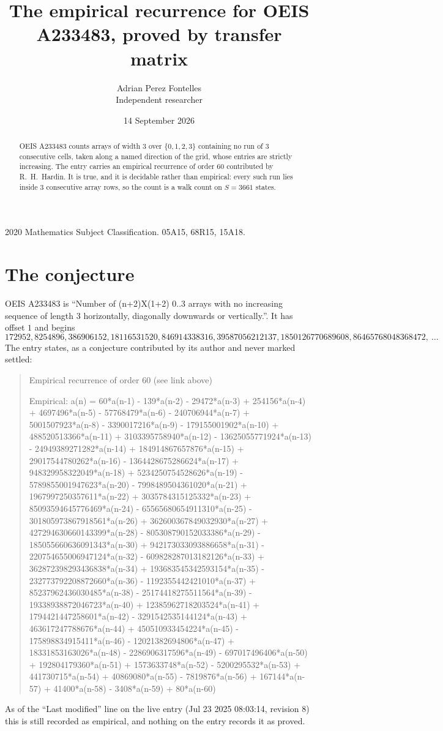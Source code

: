 \documentclass[11pt,a4paper]{article}
\title{The empirical recurrence for OEIS A233483, proved by transfer matrix}
\author{Adrian Perez Fontelles\\ \small Independent researcher}
\date{14 September 2026}
\theoremstyle{plain}
\theoremstyle{definition}
\begin{document}
\maketitle

\begin{abstract}
OEIS A233483 counts arrays of width $3$ over $\{0,1,2,3\}$ containing no run of $3$ consecutive
cells, taken along a named direction of the grid, whose entries are strictly increasing. The entry carries
an empirical recurrence of order $60$ contributed by R.~H.~Hardin. It is true, and it is
decidable rather than empirical: every such run lies inside $3$ consecutive array rows, so
the count is a walk count on $S=3661$ states.
\end{abstract}

\noindent\small 2020 Mathematics Subject Classification. 05A15, 68R15, 15A18.\normalsize

\section{The conjecture}

OEIS A233483 is ``Number of (n+2)X(1+2) 0..3 arrays with no increasing sequence of length 3 horizontally, diagonally downwards or vertically.''. It has offset $1$ and begins
\[
172952, 8254896, 386906152, 18116531520, 846914338316, 39587056212137, 1850126770689608, 86465768048368472,\ \dots
\]
The entry states, as a conjecture contributed by its author and never marked settled:
\begin{quote}
Empirical recurrence of order 60 (see link above)

Empirical: a(n) = 60*a(n-1) - 139*a(n-2) - 29472*a(n-3) + 254156*a(n-4) + 4697496*a(n-5) - 57768479*a(n-6) - 240706944*a(n-7) + 5001507923*a(n-8) - 3390017216*a(n-9) - 179155001902*a(n-10) + 488520513366*a(n-11) + 3103395758940*a(n-12) - 13625055771924*a(n-13) - 24949389271282*a(n-14) + 184914867657876*a(n-15) + 29017544780262*a(n-16) - 1364428675286624*a(n-17) + 948329958322049*a(n-18) + 5234250754528626*a(n-19) - 5789855001947623*a(n-20) - 7998489504361020*a(n-21) + 1967997250357611*a(n-22) + 3035784315125332*a(n-23) + 85093594645776469*a(n-24) - 65565680654911310*a(n-25) - 301805973867918561*a(n-26) + 362600367849032930*a(n-27) + 427294630660143399*a(n-28) - 805308790152033386*a(n-29) - 185055660636091343*a(n-30) + 942173033093886658*a(n-31) - 220754655006947124*a(n-32) - 609828287013182126*a(n-33) + 362872398293436838*a(n-34) + 193683545342593154*a(n-35) - 232773792208872660*a(n-36) - 1192355442421010*a(n-37) + 85237962436030485*a(n-38) - 25174418275511564*a(n-39) - 19338938872046723*a(n-40) + 12385962718203524*a(n-41) + 1794421447258601*a(n-42) - 3291542535144124*a(n-43) + 463617247788676*a(n-44) + 450510933454224*a(n-45) - 175898834915411*a(n-46) - 12021382694806*a(n-47) + 18331853163026*a(n-48) - 2286906317596*a(n-49) - 697017496406*a(n-50) + 192804179360*a(n-51) + 1573633748*a(n-52) - 5200295532*a(n-53) + 441730715*a(n-54) + 40869080*a(n-55) - 7819876*a(n-56) + 167144*a(n-57) + 41400*a(n-58) - 3408*a(n-59) + 80*a(n-60)
\end{quote}
As of the ``Last modified'' line on the live entry (Jul 23 2025 08:03:14, revision 8) this is still
recorded as empirical, and nothing on the entry records it as proved.
\end{document}
